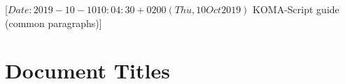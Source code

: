%
%
%
%
%
%
%
%
% 
%
%
%
%

                 [$Date: 2019-10-10 10:04:30 +0200 (Thu, 10 Oct 2019) $
                  KOMA-Script guide (common paragraphs)]



\section{Document Titles}
%
\BeginIndexGroup
{}%

